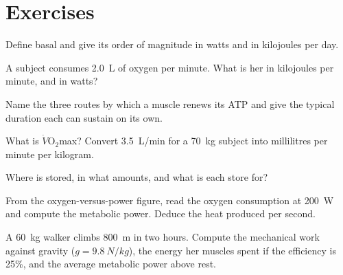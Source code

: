 \section{Exercises}

\begin{exercise}[$\star$]\label{exo:g10:exercise-and-energy:1}
Define basal  and give its order of magnitude in watts and
in kilojoules per day.
\end{exercise}

\begin{exercise}[$\star$]\label{exo:g10:exercise-and-energy:2}
A subject consumes \qty{2.0}{L} of oxygen per minute. What is her
 in kilojoules per minute, and in watts?
\end{exercise}

\begin{exercise}[$\star$]\label{exo:g10:exercise-and-energy:3}
Name the three routes by which a muscle renews its ATP and give the
typical duration each can sustain on its own.
\end{exercise}

\begin{exercise}[$\star$]\label{exo:g10:exercise-and-energy:4}
What is $\dot V\!\mathrm{O_2}$max? Convert \qty{3.5}{L/min} for a
\qty{70}{kg} subject into millilitres per minute per kilogram.
\end{exercise}

\begin{exercise}[$\star$]\label{exo:g10:exercise-and-energy:5}
Where is  stored, in what amounts, and what is each store for?
\end{exercise}

\begin{exercise}[$\star\star$]\label{exo:g10:exercise-and-energy:6}
From the oxygen-versus-power figure, read the oxygen consumption at
\qty{200}{W} and compute the metabolic power. Deduce the heat produced
per second.
\end{exercise}

\begin{exercise}[$\star\star$]\label{exo:g10:exercise-and-energy:7}
A \qty{60}{kg} walker climbs \qty{800}{m} in two hours. Compute the
mechanical work against gravity ($g = \qty{9.8}{N/kg}$), the energy
her muscles spent if the efficiency is 25\%, and the average metabolic
power above rest.
\end{exercise}

